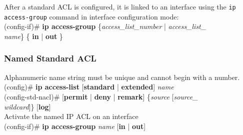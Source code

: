 \noindent
\textrm{After a standard ACL is configured, it is linked to an interface using the \texttt{ip access-group} command in interface configuration mode:}\vspace{2pt}\\
(config-if)\# \textbf{ip access-group} \{\textit{access\_list\_number} | \textit{access\_list\_\\name}\} \{ \textbf{in} | \textbf{out} \}
\subsubsection{Named Standard ACL}
\textrm{Alphanumeric name string must be unique and cannot begin with a number.}\vspace{2pt}\\
(config)\# \textbf{ip access-list} [\textbf{standard} | \textbf{extended}] \textit{name}\vspace{11pt}\\
(config-std-nacl)\# [\textbf{permit} | \textbf{deny} | \textbf{remark}] \{\textit{source} [\textit{source\_\\wildcard}]\} [\textbf{log}]\vspace{11pt}\\
\textrm{Activate the named IP ACL on an interface}\vspace{2pt}\\
(config-if)\# \textbf{ip access-group} \textit{name} [\textbf{in} | \textbf{out}]

